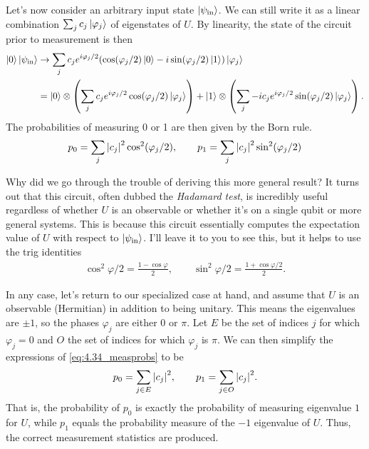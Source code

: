 \documentclass{book}
\begin{document}
    Let's now consider an arbitrary input state $\ket{\psi_\text{in}}$. We can still write it as a linear combination $\sum_j c_j \ket{\varphi_j}$ of eigenstates of $U$. By linearity, the state of the circuit prior to measurement is then
    \begin{align}
    \begin{aligned}
        \ket{0}\ket{\psi_\text{in}} &\rightarrow \sum_j c_j e^{i\varphi_j/2}(\cos (\varphi_j/2) \ket{0} - i \sin(\varphi_j/2) \ket{1})\ket{\varphi_j} \\
        &=\ket{0} \otimes \left(\sum_j c_j e^{i\varphi_j/2} \cos (\varphi_j/2) \ket{\varphi_j}\right) + \ket{1} \otimes \left(\sum_j -i c_j e^{i\varphi_j/2} \sin (\varphi_j/2) \ket{\varphi_j}\right).
    \end{aligned}
    \end{align}
    The probabilities of measuring 0 or 1 are then given by the Born rule.
    \begin{align} \label{eq:4.34_measprobs}
        p_0 = \sum_j \abs{c_j}^2 \cos^2(\varphi_j/2), \qquad p_1 = \sum_j \abs{c_j}^2 \sin^2(\varphi_j/2)
    \end{align}

    Why did we go through the trouble of deriving this more general result? It turns out that this circuit, often dubbed the \emph{Hadamard test}, is incredibly useful regardless of whether $U$ is an observable or whether it's on a single qubit or more general systems. This is because this circuit essentially computes the expectation value of $U$ with respect to $\ket{\psi_\text{in}}$. I'll leave it to you to see this, but it helps to use the trig identities
    \begin{align}
        \cos^2 \varphi/2 = \frac{1-\cos\varphi}{2}, \qquad \sin^2 \varphi/2 = \frac{1 + \cos\varphi/2}{2}.
    \end{align}

    In any case, let's return to our specialized case at hand, and assume that $U$ is an observable (Hermitian) in addition to being unitary. This means the eigenvalues are $\pm 1$, so the phases $\varphi_j$ are either $0$ or $\pi$. Let $E$ be the set of indices $j$ for which $\varphi_j = 0$ and $O$ the set of indices for which $\varphi_j$ is $\pi$. We can then simplify the expressions of \eqref{eq:4.34_measprobs} to be
    \begin{align}
        p_0 = \sum_{j \in E} \abs{c_j}^2, \qquad p_1 = \sum_{j \in O} \abs{c_j}^2.
    \end{align}
    That is, the probability of $p_0$ is exactly the probability of measuring eigenvalue $1$ for $U$, while $p_1$ equals the probability measure of the $-1$ eigenvalue of $U$. Thus, the correct measurement statistics are produced.
\end{document}
